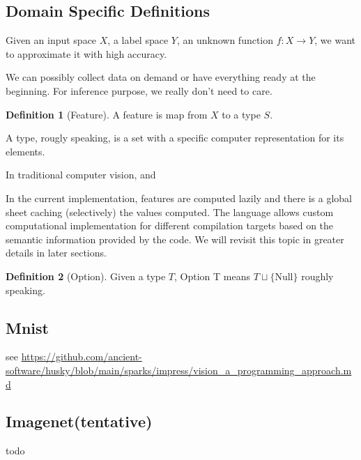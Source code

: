 \documentclass[11pt, oneside]{article}   	%
\theoremstyle{definition}
\newtheorem*{defn}{Definition}
\begin{document}
\subsection{Domain Specific Definitions}

Given an input space $X$, a label space $Y$, an unknown function $f: X\to Y$, we want to approximate it with high accuracy.

\begin{rmk}
We can possibly collect data on demand or have everything ready at the beginning. For inference purpose, we really don't need to care.
\end{rmk}

\begin{defn}[Feature]
	A feature is map from $X$ to a type $S$.
\end{defn}

\begin{rmk}
	A type, rougly speaking, is a set with a specific computer representation for its elements.
\end{rmk}

\begin{rmk}
	In traditional computer vision, and 
\end{rmk}

\begin{rmk}
	In the current implementation, features are computed lazily and there is a global sheet caching (selectively) the values computed. The language allows custom computational implementation for different compilation targets based on the semantic information provided by the code. We will revisit this topic in greater details in later sections.
\end{rmk}

\begin{defn}[Option]
	Given a type $T$, Option T means $T\sqcup \{\text{Null}\}$ roughly speaking.
\end{defn}
\subsection{Mnist}

see \url{https://github.com/ancient-software/husky/blob/main/sparks/impress/vision_a_programming_approach.md}
\subsection{Imagenet(tentative)}

todo
\end{document}

